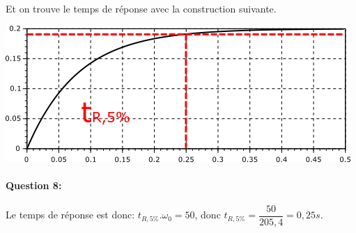 Et on trouve le temps de réponse avec la construction suivante.

\begin{center}
	\includegraphics[width=0.7\linewidth]{img/temps_rep}
\end{center}
	
\paragraph{Question 8:}

Le temps de réponse est donc: $t_{R,5\%}.\omega_0=50$, donc $t_{R,5\%}=\dfrac{50}{205,4}=0,25s$.

